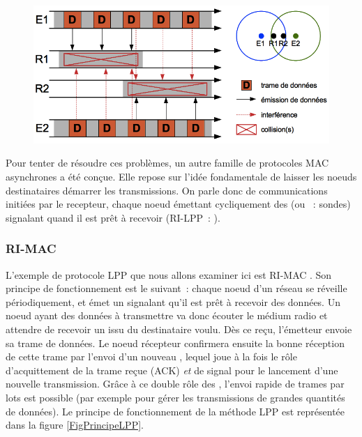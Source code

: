 \begin{figure}[!hbt]
\centering
\includegraphics[width=12.75cm]{images/ch3-collisions-cachees.png}
\label{FigCollisionsCachees}
\end{figure}

Pour tenter de résoudre ces problèmes, un autre famille de protocoles
MAC asynchrones a été conçue. Elle repose sur l'idée fondamentale
de laisser les noeuds destinataires démarrer les transmissions.
On parle donc de communications initiées par le recepteur, chaque noeud
émettant cycliquement des  (ou ~: sondes)
signalant quand il est prêt à recevoir (RI-LPP~: ).

\subsubsection{RI-MAC}
\label{ParRIMAC}

L'exemple de protocole LPP que nous allons examiner ici est RI-MAC
\cite{RIMAC}. Son principe de fonctionnement est le suivant~: chaque
noeud d'un réseau se réveille périodiquement, et émet un 
signalant qu'il est prêt à recevoir des données. Un noeud ayant des données
à transmettre va donc écouter le médium radio et attendre de recevoir
un  issu du destinataire voulu. Dès ce 
reçu, l'émetteur envoie sa trame de données. Le noeud récepteur confirmera
ensuite la bonne réception de cette trame par l'envoi d'un nouveau
, lequel joue à la fois le rôle d'acquittement de la trame
reçue (ACK) \emph{et} de signal pour le lancement d'une nouvelle transmission.
Grâce à ce double rôle des , l'envoi rapide de trames
par lots est possible (par exemple pour gérer les transmissions de grandes
quantités de données). Le principe de fonctionnement de la méthode LPP
est représentée dans la figure \vref{FigPrincipeLPP}.

